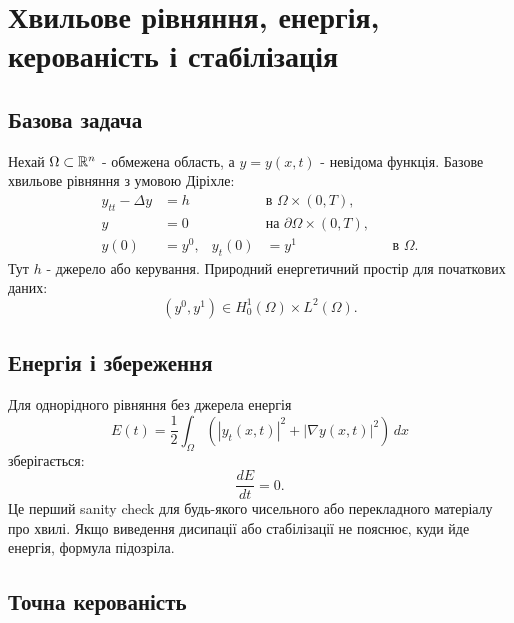 \chapter{Хвильове рівняння, енергія, керованість і стабілізація}
\label{ch:wave-control-pde}


\section{Базова задача}

Нехай $\Omega\subset\mathbb{R}^n$ - обмежена область, а $y=y(x,t)$ - невідома функція. Базове хвильове рівняння з умовою Діріхле:
\begin{subequations}
\begin{align}
  y_{tt}-\Delta y &= h && \text{в } \Omega\times(0,T),\\
  y &= 0 && \text{на } \partial\Omega\times(0,T),\\
  y(0)&=y^0,
  & y_t(0)&=y^1 && \text{в } \Omega.
\end{align}
\end{subequations}
Тут $h$ - джерело або керування. Природний енергетичний простір для початкових даних:
\begin{equation}
  (y^0,y^1)\in H_0^1(\Omega)\times L^2(\Omega).
\end{equation}

\section{Енергія і збереження}

Для однорідного рівняння без джерела енергія
\begin{equation}
  E(t)=\frac12\int_\Omega \left(|y_t(x,t)|^2 + |\nabla y(x,t)|^2\right)\,dx
\end{equation}
зберігається:
\begin{equation}
  \frac{dE}{dt}=0.
\end{equation}
Це перший sanity check для будь-якого чисельного або перекладного матеріалу про хвилі. Якщо виведення дисипації або стабілізації не пояснює, куди йде енергія, формула підозріла.

\section{Точна керованість}

